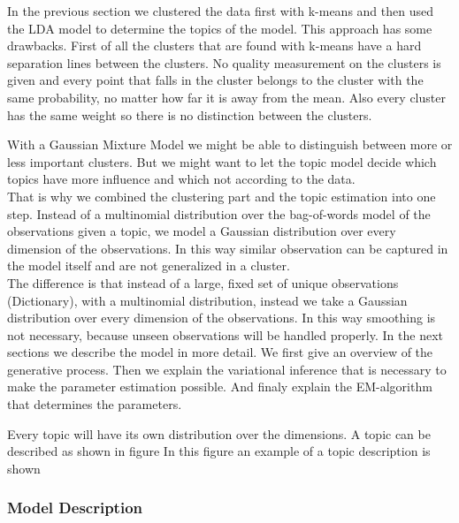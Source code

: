 \documentclass[11pt,a4paper]{article}
\begin{document}
In the previous section we clustered the data first with k-means and then used the LDA model to determine the topics of the model. This approach has some drawbacks. First of all the clusters that are found with k-means have a hard separation lines between the clusters. No quality measurement on the clusters is given and every point that falls in the cluster belongs to the cluster with the same probability, no matter how far it is away from the mean. Also every cluster has the same weight so there is no distinction between the clusters.

With a Gaussian Mixture Model we might be able to distinguish between more or less important clusters. But we might want to let the topic model decide which topics have more influence and which not according to the data.\\
That is why we combined the clustering part and the topic estimation into one step. Instead of a multinomial distribution over the bag-of-words model of the observations given a topic, we model a Gaussian distribution over every dimension of the observations. In this way similar observation can be captured in the model itself and are not generalized in a cluster.\\
The difference is that instead of a large, fixed set of unique observations (Dictionary), with a multinomial distribution, instead we take a Gaussian distribution over every dimension of the observations. In this way smoothing is not necessary, because unseen observations will be handled properly.
In the next sections we describe the model in more detail. We first give an overview of the generative process. Then we explain the variational inference that is necessary to make the parameter estimation possible. And finaly explain the EM-algorithm that determines the parameters.

Every topic will have its own distribution over the dimensions. A
topic can be described as shown in figure %
In this figure an example of a topic description is shown

  \subsubsection{Model Description}
  
\end{document}
